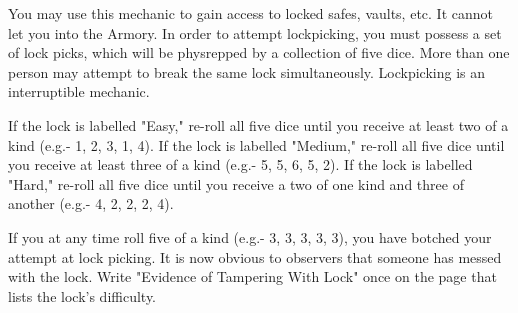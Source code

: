 \documentclass[green]{guildcamp3}
\begin{document}
	
	\name{\gLockpicking{}}
	

	
	You may use this mechanic to gain access to locked safes, vaults, etc. It cannot let you into the Armory.
	In order to attempt lockpicking, you must possess a set of lock picks, which will be physrepped by a collection of five dice. More than one person may attempt to break the same lock simultaneously. Lockpicking is an interruptible mechanic.
	
	
	\begin{enum}[Directions]
		\item If the lock is labelled "Easy," re-roll all five dice until you receive at least two of a kind (e.g.- 1, 2, 3, 1, 4). If the lock is labelled "Medium," re-roll all five dice until you receive at least three of a kind (e.g.- 5, 5, 6, 5, 2). If the lock is labelled "Hard," re-roll all five dice until you receive a two of one kind and three of another (e.g.- 4, 2, 2, 2, 4).
		\item If you at any time roll five of a kind (e.g.- 3, 3, 3, 3, 3), you have botched your attempt at lock picking. It is now obvious to observers that someone has messed with the lock. Write "Evidence of Tampering With Lock" once on the page that lists the lock's difficulty.
		\end{enum}
	
	
\end{document}
